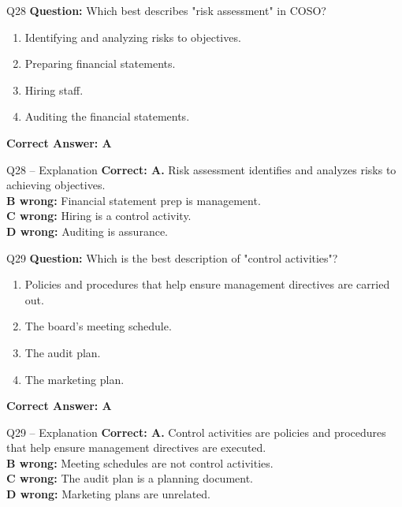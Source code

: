 \documentclass[aspectratio=169,10pt]{beamer}
\begin{document}
	\begin{frame}[t]{Q28}
		\small
		\textbf{Question:} Which best describes "risk assessment" in COSO?
		\begin{enumerate}[label=\Alph*.,itemsep=1pt,topsep=2pt]
			\item Identifying and analyzing risks to objectives.
			\item Preparing financial statements.
			\item Hiring staff.
			\item Auditing the financial statements.
		\end{enumerate}
		\vspace{4pt}
		\textbf{Correct Answer: A}
	\end{frame}
	
	\begin{frame}[t]{Q28 -- Explanation}
		\small
		\textbf{Correct: A.} Risk assessment identifies and analyzes risks to achieving objectives. \\[4pt]
		\textbf{B wrong:} Financial statement prep is management. \\[2pt]
		\textbf{C wrong:} Hiring is a control activity. \\[2pt]
		\textbf{D wrong:} Auditing is assurance.
	\end{frame}
	
	\begin{frame}[t]{Q29}
		\small
		\textbf{Question:} Which is the best description of "control activities"?
		\begin{enumerate}[label=\Alph*.,itemsep=1pt,topsep=2pt]
			\item Policies and procedures that help ensure management directives are carried out.
			\item The board's meeting schedule.
			\item The audit plan.
			\item The marketing plan.
		\end{enumerate}
		\vspace{4pt}
		\textbf{Correct Answer: A}
	\end{frame}
	
	\begin{frame}[t]{Q29 -- Explanation}
		\small
		\textbf{Correct: A.} Control activities are policies and procedures that help ensure management directives are executed. \\[4pt]
		\textbf{B wrong:} Meeting schedules are not control activities. \\[2pt]
		\textbf{C wrong:} The audit plan is a planning document. \\[2pt]
		\textbf{D wrong:} Marketing plans are unrelated.
	\end{frame}
	
\end{document}
